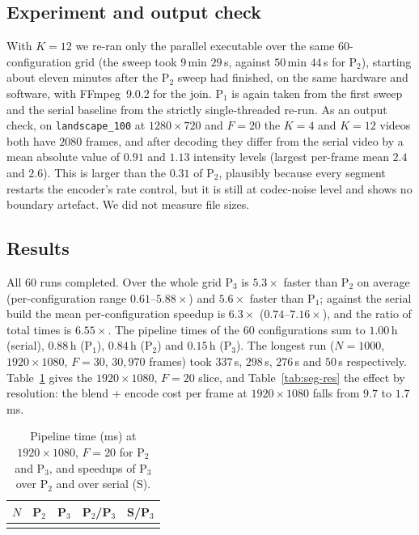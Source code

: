\documentclass[conference]{IEEEtran}
\begin{document}
\subsection{Experiment and output check}
With $K{=}12$ we re-ran only the parallel executable over the same $60$-configuration grid (the sweep took $9$\,min $29$\,s, against $50$\,min $44$\,s for P$_2$), starting about eleven minutes after the P$_2$ sweep had finished, on the same hardware and software, with FFmpeg~9.0.2 for the join. P$_1$ is again taken from the first sweep and the serial baseline from the strictly single-threaded re-run. As an output check, on \texttt{landscape\_100} at $1280\times720$ and $F{=}20$ the $K{=}4$ and $K{=}12$ videos both have $2080$ frames, and after decoding they differ from the serial video by a mean absolute value of $0.91$ and $1.13$ intensity levels (largest per-frame mean $2.4$ and $2.6$). This is larger than the $0.31$ of P$_2$, plausibly because every segment restarts the encoder's rate control, but it is still at codec-noise level and shows no boundary artefact. We did not measure file sizes.

\subsection{Results}
All $60$ runs completed. Over the whole grid P$_3$ is $5.3\times$ faster than P$_2$ on average (per-configuration range $0.61$--$5.88\times$) and $5.6\times$ faster than P$_1$; against the serial build the mean per-configuration speedup is $6.3\times$ ($0.74$--$7.16\times$), and the ratio of total times is $6.55\times$. The pipeline times of the $60$ configurations sum to $1.00$\,h (serial), $0.88$\,h (P$_1$), $0.84$\,h (P$_2$) and $0.15$\,h (P$_3$). The longest run ($N{=}1000$, $1920\times1080$, $F{=}30$, $30{,}970$ frames) took $337$\,s, $298$\,s, $276$\,s and $50$\,s respectively. Table~\ref{tab:seg-main} gives the $1920\times1080$, $F{=}20$ slice, and Table~\ref{tab:seg-res} the effect by resolution: the blend + encode cost per frame at $1920\times1080$ falls from $9.7$ to $1.7$\,ms.

\begin{table}[t]
\caption{Pipeline time (ms) at $1920\times1080$, $F{=}20$ for P$_2$ and P$_3$, and speedups of P$_3$ over P$_2$ and over serial (S).}
\label{tab:seg-main}
\centering
\footnotesize
\setlength{\tabcolsep}{5pt}
\begin{tabular}{@{}rrrrr@{}}
\toprule
$N$ & P$_2$ & P$_3$ & P$_2$/P$_3$ & S/P$_3$ \\
\midrule
\\
\bottomrule
\end{tabular}
\end{table}
\end{document}
